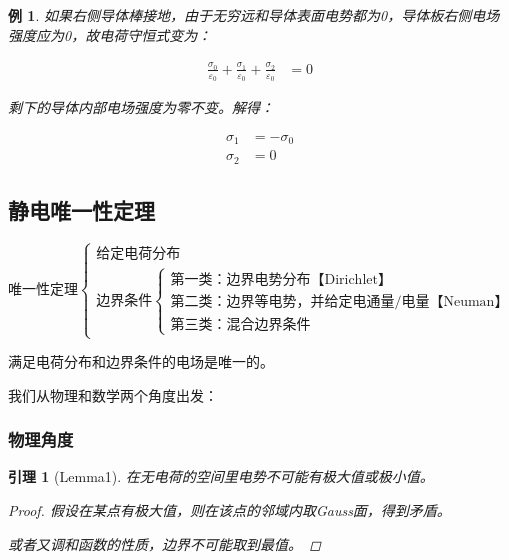 \documentclass[12pt,onecolumn,a4paper]{book}
\newtheorem*{example}{例}
\newtheorem*{lemma}{引理}
\numberwithin{table}{subsection}
\numberwithin{equation}{subsection}
\begin{document}
\begin{example}
    如果右侧导体棒接地，由于无穷远和导体表面电势都为0，导体板右侧电场强度应为0，故电荷守恒式变为：

    \begin{align}
        \frac{\sigma_0}{\varepsilon_0}+\frac{\sigma_1}{\varepsilon_0}+\frac{\sigma_2}{\varepsilon_0} & =0
    \end{align}

    剩下的导体内部电场强度为零不变。解得：

    \begin{align}
        \sigma_1 & = -\sigma_0 \\
        \sigma_2 & = 0
    \end{align}
\end{example}

\subsection{静电唯一性定理}

\[
    \text{唯一性定理}\left\{
    \begin{array}{l}
        \text{给定电荷分布} \\
        \text{边界条件} \left\{
        \begin{array}{l}
            \text{第一类：边界电势分布【Dirichlet】}       \\
            \text{第二类：边界等电势，并给定电通量/电量【Neuman】} \\
            \text{第三类：混合边界条件}
        \end{array}
        \right.
    \end{array}
    \right.
\]

满足电荷分布和边界条件的电场是唯一的。

我们从物理和数学两个角度出发：

\subsubsection{物理角度}

\begin{lemma}[Lemma1]
    在无电荷的空间里电势不可能有极大值或极小值。

    \begin{proof}
        假设在某点有极大值，则在该点的邻域内取Gauss面，得到矛盾。

        或者又调和函数的性质，边界不可能取到最值。
    \end{proof}
\end{lemma}
\end{document}
